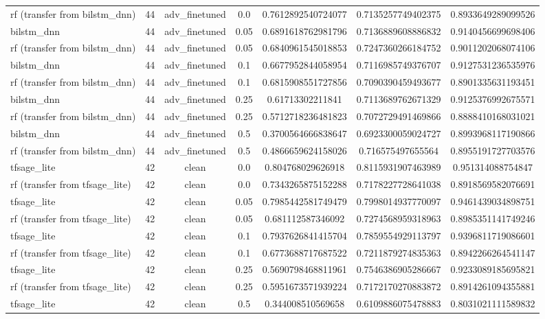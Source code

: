 \begin{table}[htbp]
\begin{tabular}{lcccccc}
rf (transfer from bilstm\_dnn) & 44 & adv\_finetuned & 0.0 & 0.7612892540724077 & 0.7135257749402375 & 0.8933649289099526 \\
bilstm\_dnn & 44 & adv\_finetuned & 0.05 & 0.6891618762981796 & 0.7136889608886832 & 0.9140456699698406 \\
rf (transfer from bilstm\_dnn) & 44 & adv\_finetuned & 0.05 & 0.6840961545018853 & 0.7247360266184752 & 0.9011202068074106 \\
bilstm\_dnn & 44 & adv\_finetuned & 0.1 & 0.6677952844058954 & 0.7116985749376707 & 0.9127531236535976 \\
rf (transfer from bilstm\_dnn) & 44 & adv\_finetuned & 0.1 & 0.6815908551727856 & 0.7090390459493677 & 0.8901335631193451 \\
bilstm\_dnn & 44 & adv\_finetuned & 0.25 & 0.61713302211841 & 0.7113689762671329 & 0.9125376992675571 \\
rf (transfer from bilstm\_dnn) & 44 & adv\_finetuned & 0.25 & 0.5712718236481823 & 0.7072729491469866 & 0.8888410168031021 \\
bilstm\_dnn & 44 & adv\_finetuned & 0.5 & 0.3700564666838647 & 0.6923300059024727 & 0.8993968117190866 \\
rf (transfer from bilstm\_dnn) & 44 & adv\_finetuned & 0.5 & 0.4866659624158026 & 0.716575497655564 & 0.8955191727703576 \\
tfsage\_lite & 42 & clean & 0.0 & 0.804768029626918 & 0.8115931907463989 & 0.951314088754847 \\
rf (transfer from tfsage\_lite) & 42 & clean & 0.0 & 0.7343265875152288 & 0.7178227728641038 & 0.8918569582076691 \\
tfsage\_lite & 42 & clean & 0.05 & 0.7985442581749479 & 0.7998014937770097 & 0.9461439034898751 \\
rf (transfer from tfsage\_lite) & 42 & clean & 0.05 & 0.681112587346092 & 0.7274568959318963 & 0.8985351141749246 \\
tfsage\_lite & 42 & clean & 0.1 & 0.7937626841415704 & 0.7859554929113797 & 0.9396811719086601 \\
rf (transfer from tfsage\_lite) & 42 & clean & 0.1 & 0.6773688717687522 & 0.7211879274835363 & 0.8942266264541147 \\
tfsage\_lite & 42 & clean & 0.25 & 0.5690798468811961 & 0.7546386905286667 & 0.9233089185695821 \\
rf (transfer from tfsage\_lite) & 42 & clean & 0.25 & 0.5951673571939224 & 0.7172170270883872 & 0.8914261094355881 \\
tfsage\_lite & 42 & clean & 0.5 & 0.344008510569658 & 0.6109886075478883 & 0.8031021111589832 \\

\end{tabular}
\end{table}
